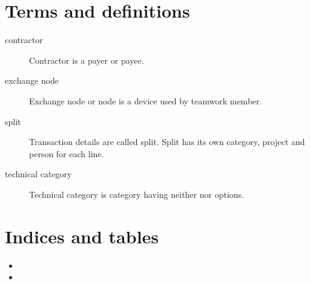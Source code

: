 \documentclass[a4paper,10pt,english]{sphinxmanual}
\begin{document}
\chapter{Terms and definitions}
\label{\detokenize{glossary:terms-and-definitions}}\label{\detokenize{glossary:chapter-index}}\label{\detokenize{glossary::doc}}\begin{description}
\item[{contractor\label{\detokenize{glossary:term-contractor}}}] \leavevmode
Contractor is a payer or payee.

\item[{exchange node\label{\detokenize{glossary:term-exchange-node}}}] \leavevmode
Exchange node or node is a device used by teamwork member.

\item[{split\label{\detokenize{glossary:term-split}}}] \leavevmode
Transaction details are called split. Split has its own category, project and person for each line.

\item[{technical category\label{\detokenize{glossary:term-technical-category}}}] \leavevmode
Technical category is category having neither  nor 
options.

\end{description}


\chapter{Indices and tables}
\label{\detokenize{index:indices-and-tables}}\begin{itemize}
\item {} 

\item {} 

\end{itemize}



\renewcommand{\indexname}{Index}
\printindex
\end{document}
